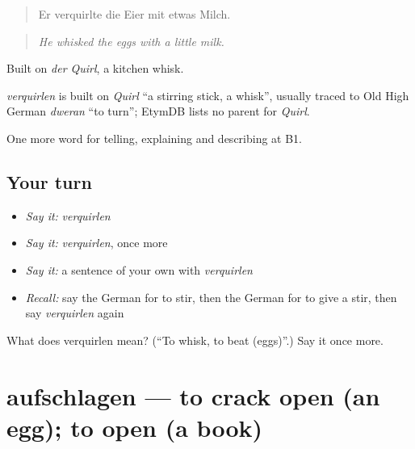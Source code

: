 \begin{quote}
Er verquirlte die Eier mit etwas Milch.
\end{quote}

\begin{quote}
\emph{He whisked the eggs with a little milk.}
\end{quote}

Built on \emph{der Quirl}, a kitchen whisk.

\begin{cousinweb}
\emph{verquirlen} is built on \emph{Quirl} \textquotedblleft{}a stirring stick, a whisk\textquotedblright{}, usually traced to Old High German \emph{dweran} \textquotedblleft{}to turn\textquotedblright{}; EtymDB lists no parent for \emph{Quirl}.
\end{cousinweb}

\begin{grammarlens}[title={What you've built}]
One more word for telling, explaining and describing at B1.
\end{grammarlens}

\subsection*{Your turn}
\begin{itemize}
\raggedright
  \item \emph{Say it:} \emph{verquirlen}
  \item \emph{Say it:} \emph{verquirlen}, once more
  \item \emph{Say it:} a sentence of your own with \emph{verquirlen}
  \item \emph{Recall:} say the German for to stir, then the German for to give a stir, then say \emph{verquirlen} again
\end{itemize}

\begin{tcolorbox}[breakable,colback=teal!4,colframe=teal!35!black,title={Before you move on}]
What does verquirlen mean? (\textquotedblleft{}To whisk, to beat (eggs)\textquotedblright{}.) Say it once more.
\end{tcolorbox}
\section[aufschlagen]{aufschlagen — to crack open (an egg); to open (a book)}

\label{lesson:GE-C324-aufschlagen}



